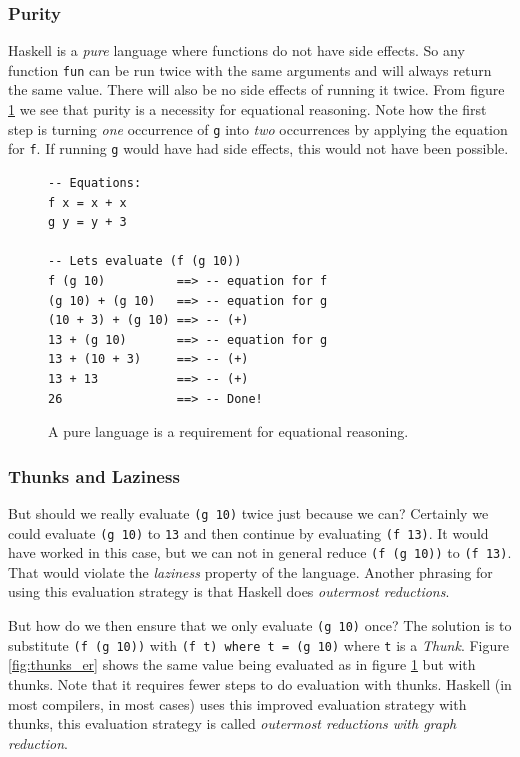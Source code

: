 \subsubsection{Purity}

Haskell is a \emph{pure} language where functions do not have side
effects. So any function \texttt{fun} can be run twice with the same
arguments and will always return the same value. There will also be no
side effects of running it twice. From figure \ref{fig:purity_er} we
see that purity is a necessity for equational reasoning. Note how the
first step is turning \emph{one} occurrence of \texttt{g} into \emph{two}
occurrences by applying the equation for \texttt{f}. If running \texttt{g}
would have had side effects, this would not have been possible.

\begin{figure}
\begin{mdframed}
  \begin{verbatim}
-- Equations:
f x = x + x
g y = y + 3

-- Lets evaluate (f (g 10))
f (g 10)          ==> -- equation for f
(g 10) + (g 10)   ==> -- equation for g
(10 + 3) + (g 10) ==> -- (+)
13 + (g 10)       ==> -- equation for g
13 + (10 + 3)     ==> -- (+)
13 + 13           ==> -- (+)
26                ==> -- Done!
  \end{verbatim}
  \caption{A pure language is a requirement for equational reasoning.}
  \label{fig:purity_er}
\end{mdframed}
\end{figure}

\subsubsection{Thunks and Laziness}

But should we really evaluate \texttt{(g 10)} twice just because we can?
Certainly we could evaluate \texttt{(g 10)} to \texttt{13} and then 
continue by evaluating \texttt{(f 13)}.  It would have worked in this
case, but we can not
in general reduce \texttt{(f (g 10))} to \texttt{(f 13)}. That would
violate the \emph{laziness} property of the language.  Another phrasing for
using this evaluation strategy is that Haskell does \emph{outermost reductions}.

But how do we then ensure that we only evaluate \texttt{(g 10)} once?
The solution is to substitute \texttt{(f (g 10))} with \texttt{(f
t) where t = (g 10)} where \texttt{t} is a \emph{Thunk}. Figure
\ref{fig:thunks_er} shows the same value being evaluated as in figure
\ref{fig:purity_er} but with thunks. Note that it requires fewer steps
to do evaluation with thunks. Haskell (in most compilers, in most cases)
uses this improved evaluation strategy with thunks, this evaluation
strategy is called \emph{outermost reductions with graph reduction}.
\cite{wikibooks_graph_reduction}

